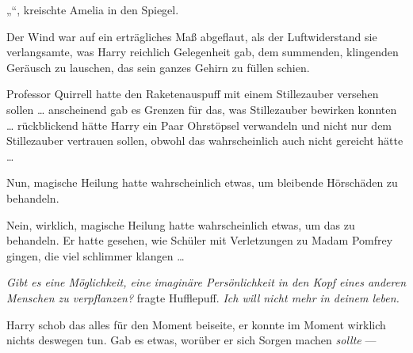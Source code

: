 \later

„“, kreischte Amelia in den Spiegel.

\later

Der Wind war auf ein erträgliches Maß abgeflaut, als der Luftwiderstand sie verlangsamte, was Harry reichlich Gelegenheit gab, dem summenden, klingenden Geräusch zu lauschen, das sein ganzes Gehirn zu füllen schien.

Professor Quirrell hatte den Raketenauspuff mit einem Stillezauber versehen sollen … anscheinend gab es Grenzen für das, was Stillezauber bewirken konnten … rückblickend hätte Harry ein Paar Ohrstöpsel verwandeln und nicht nur dem Stillezauber vertrauen sollen, obwohl das wahrscheinlich auch nicht gereicht hätte …

Nun, magische Heilung hatte wahrscheinlich etwas, um bleibende Hörschäden zu behandeln.

Nein, wirklich, magische Heilung hatte wahrscheinlich etwas, um das zu behandeln. Er hatte gesehen, wie Schüler mit Verletzungen zu Madam Pomfrey gingen, die viel schlimmer klangen …

\emph{Gibt es eine Möglichkeit, eine imaginäre Persönlichkeit in den Kopf eines anderen Menschen zu verpflanzen?} fragte Hufflepuff. \emph{Ich will nicht mehr in deinem leben.}

Harry schob das alles für den Moment beiseite, er konnte im Moment wirklich nichts deswegen tun. Gab es etwas, worüber er sich Sorgen machen \emph{sollte} —


